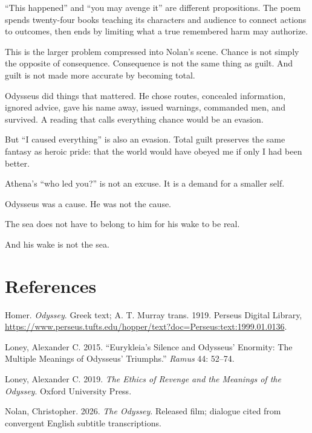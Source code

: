 \documentclass[11pt]{article}
\begin{document}
``This happened'' and ``you may avenge it'' are different propositions. The poem spends twenty-four books teaching its characters and audience to connect actions to outcomes, then ends by limiting what a true remembered harm may authorize.

This is the larger problem compressed into Nolan's scene. Chance is not simply the opposite of consequence. Consequence is not the same thing as guilt. And guilt is not made more accurate by becoming total.

Odysseus did things that mattered. He chose routes, concealed information, ignored advice, gave his name away, issued warnings, commanded men, and survived. A reading that calls everything chance would be an evasion.

But ``I caused everything'' is also an evasion. Total guilt preserves the same fantasy as heroic pride: that the world would have obeyed me if only I had been better.

Athena's ``who led you?'' is not an excuse. It is a demand for a smaller self.

Odysseus was a cause. He was not the cause.

The sea does not have to belong to him for his wake to be real.

And his wake is not the sea.

\section*{References}

\small
Homer. \textit{Odyssey}. Greek text; A. T. Murray trans. 1919. Perseus Digital Library, \url{https://www.perseus.tufts.edu/hopper/text?doc=Perseus:text:1999.01.0136}.

Loney, Alexander C. 2015. ``Eurykleia's Silence and Odysseus' Enormity: The Multiple Meanings of Odysseus' Triumphs.'' \textit{Ramus} 44: 52--74.

Loney, Alexander C. 2019. \textit{The Ethics of Revenge and the Meanings of the Odyssey}. Oxford University Press.

Nolan, Christopher. 2026. \textit{The Odyssey}. Released film; dialogue cited from convergent English subtitle transcriptions.
\end{document}
